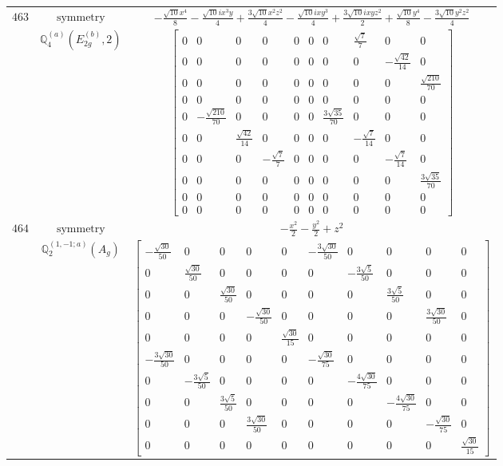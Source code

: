\documentclass[fleqn,8pt,landscape]{jsarticle}
\begin{document}
\begin{longtable}{ccc}
$ 463 $ & $ \text{symmetry} $ & $ - \frac{\sqrt{10} x^{4}}{8} - \frac{\sqrt{10} i x^{3} y}{4} + \frac{3 \sqrt{10} x^{2} z^{2}}{4} - \frac{\sqrt{10} i x y^{3}}{4} + \frac{3 \sqrt{10} i x y z^{2}}{2} + \frac{\sqrt{10} y^{4}}{8} - \frac{3 \sqrt{10} y^{2} z^{2}}{4} $ \\
$  $ & $ \mathbb{Q}_{4}^{(a)}(E_{2g}^{(b)},2) $ & $ \begin{bmatrix} 0 & 0 & 0 & 0 & 0 & 0 & 0 & \frac{\sqrt{7}}{7} & 0 & 0 \\ 0 & 0 & 0 & 0 & 0 & 0 & 0 & 0 & - \frac{\sqrt{42}}{14} & 0 \\ 0 & 0 & 0 & 0 & 0 & 0 & 0 & 0 & 0 & \frac{\sqrt{210}}{70} \\ 0 & 0 & 0 & 0 & 0 & 0 & 0 & 0 & 0 & 0 \\ 0 & - \frac{\sqrt{210}}{70} & 0 & 0 & 0 & 0 & \frac{3 \sqrt{35}}{70} & 0 & 0 & 0 \\ 0 & 0 & \frac{\sqrt{42}}{14} & 0 & 0 & 0 & 0 & - \frac{\sqrt{7}}{14} & 0 & 0 \\ 0 & 0 & 0 & - \frac{\sqrt{7}}{7} & 0 & 0 & 0 & 0 & - \frac{\sqrt{7}}{14} & 0 \\ 0 & 0 & 0 & 0 & 0 & 0 & 0 & 0 & 0 & \frac{3 \sqrt{35}}{70} \\ 0 & 0 & 0 & 0 & 0 & 0 & 0 & 0 & 0 & 0 \\ 0 & 0 & 0 & 0 & 0 & 0 & 0 & 0 & 0 & 0 \end{bmatrix} $ \\ \hline
$ 464 $ & $ \text{symmetry} $ & $ - \frac{x^{2}}{2} - \frac{y^{2}}{2} + z^{2} $ \\
$  $ & $ \mathbb{Q}_{2}^{(1,-1;a)}(A_{g}) $ & $ \begin{bmatrix} - \frac{\sqrt{30}}{50} & 0 & 0 & 0 & 0 & - \frac{3 \sqrt{30}}{50} & 0 & 0 & 0 & 0 \\ 0 & \frac{\sqrt{30}}{50} & 0 & 0 & 0 & 0 & - \frac{3 \sqrt{5}}{50} & 0 & 0 & 0 \\ 0 & 0 & \frac{\sqrt{30}}{50} & 0 & 0 & 0 & 0 & \frac{3 \sqrt{5}}{50} & 0 & 0 \\ 0 & 0 & 0 & - \frac{\sqrt{30}}{50} & 0 & 0 & 0 & 0 & \frac{3 \sqrt{30}}{50} & 0 \\ 0 & 0 & 0 & 0 & \frac{\sqrt{30}}{15} & 0 & 0 & 0 & 0 & 0 \\ - \frac{3 \sqrt{30}}{50} & 0 & 0 & 0 & 0 & - \frac{\sqrt{30}}{75} & 0 & 0 & 0 & 0 \\ 0 & - \frac{3 \sqrt{5}}{50} & 0 & 0 & 0 & 0 & - \frac{4 \sqrt{30}}{75} & 0 & 0 & 0 \\ 0 & 0 & \frac{3 \sqrt{5}}{50} & 0 & 0 & 0 & 0 & - \frac{4 \sqrt{30}}{75} & 0 & 0 \\ 0 & 0 & 0 & \frac{3 \sqrt{30}}{50} & 0 & 0 & 0 & 0 & - \frac{\sqrt{30}}{75} & 0 \\ 0 & 0 & 0 & 0 & 0 & 0 & 0 & 0 & 0 & \frac{\sqrt{30}}{15} \end{bmatrix} $ \\ \hline

\end{longtable}
\end{document}
